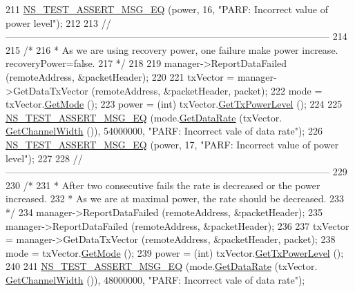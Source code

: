 \begin{DoxyCode}
211   \hyperlink{group__testing_ga2a9d78cffb3db8e867c35fff0b698cf5}{NS\_TEST\_ASSERT\_MSG\_EQ} (power, 16, \textcolor{stringliteral}{"PARF: Incorrect value of power level"});
212 
213   \textcolor{comment}{//-----------------------------------------------------------------------------------------------------}
214 
215   \textcolor{comment}{/*}
216 \textcolor{comment}{   * As we are using recovery power, one failure make power increase. recoveryPower=false.}
217 \textcolor{comment}{   */}
218 
219   manager->ReportDataFailed (remoteAddress, &packetHeader);
220 
221   txVector = manager->GetDataTxVector (remoteAddress, &packetHeader, packet);
222   mode = txVector.\hyperlink{classns3_1_1WifiTxVector_a497b1f11cad4b8b26251dfa07c9ad1d6}{GetMode} ();
223   power = (int) txVector.\hyperlink{classns3_1_1WifiTxVector_a7c98bd9609ff1c5cefa6e22d6908a2fe}{GetTxPowerLevel} ();
224 
225   \hyperlink{group__testing_ga2a9d78cffb3db8e867c35fff0b698cf5}{NS\_TEST\_ASSERT\_MSG\_EQ} (mode.\hyperlink{classns3_1_1WifiMode_adcfbe150f69da720db23387f733b8a52}{GetDataRate} (txVector.
      \hyperlink{classns3_1_1WifiTxVector_a1f8bfa51778a3e217581eb665f059564}{GetChannelWidth} ()), 54000000, \textcolor{stringliteral}{"PARF: Incorrect vale of data rate"});
226   \hyperlink{group__testing_ga2a9d78cffb3db8e867c35fff0b698cf5}{NS\_TEST\_ASSERT\_MSG\_EQ} (power, 17, \textcolor{stringliteral}{"PARF: Incorrect value of power level"});
227 
228   \textcolor{comment}{//-----------------------------------------------------------------------------------------------------}
229 
230   \textcolor{comment}{/*}
231 \textcolor{comment}{   * After two consecutive fails the rate is decreased or the power increased.}
232 \textcolor{comment}{   * As we are at maximal power, the rate should be decreased.}
233 \textcolor{comment}{   */}
234   manager->ReportDataFailed (remoteAddress, &packetHeader);
235   manager->ReportDataFailed (remoteAddress, &packetHeader);
236 
237   txVector = manager->GetDataTxVector (remoteAddress, &packetHeader, packet);
238   mode = txVector.\hyperlink{classns3_1_1WifiTxVector_a497b1f11cad4b8b26251dfa07c9ad1d6}{GetMode} ();
239   power = (int) txVector.\hyperlink{classns3_1_1WifiTxVector_a7c98bd9609ff1c5cefa6e22d6908a2fe}{GetTxPowerLevel} ();
240 
241   \hyperlink{group__testing_ga2a9d78cffb3db8e867c35fff0b698cf5}{NS\_TEST\_ASSERT\_MSG\_EQ} (mode.\hyperlink{classns3_1_1WifiMode_adcfbe150f69da720db23387f733b8a52}{GetDataRate} (txVector.
      \hyperlink{classns3_1_1WifiTxVector_a1f8bfa51778a3e217581eb665f059564}{GetChannelWidth} ()), 48000000, \textcolor{stringliteral}{"PARF: Incorrect vale of data rate"});

\end{DoxyCode}
